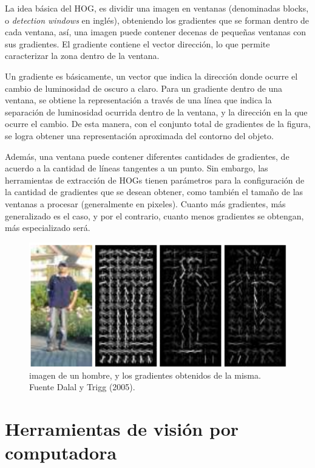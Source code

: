 \documentclass[a4paper,12pt,oneside,spanish]{book}
\begin{document}
La idea básica del HOG, es dividir una imagen en ventanas (denominadas blocks, o \textit{detection windows} en inglés), obteniendo los gradientes que se forman dentro de cada ventana, así, una imagen puede contener decenas de pequeñas ventanas con sus gradientes. El gradiente contiene el vector dirección, lo que permite caracterizar la zona dentro de la ventana.\par

Un gradiente es básicamente, un vector que indica la dirección donde ocurre el cambio de luminosidad de oscuro a claro. Para un gradiente dentro de una ventana, se obtiene la representación a través de una línea que indica la separación de luminosidad ocurrida dentro de la ventana, y la dirección en la que ocurre el cambio. De esta manera, con el conjunto total de gradientes de la figura, se logra obtener una representación aproximada del contorno del objeto.\par

Además, una ventana puede contener diferentes cantidades de gradientes, de acuerdo a la cantidad de líneas tangentes a un punto. Sin embargo, las herramientas de extracción de HOGs tienen parámetros para la configuración de la cantidad de gradientes que se desean obtener, como también el tamaño de las ventanas a procesar (generalmente en pixeles). Cuanto más gradientes, más generalizado es el caso, y por el contrario, cuanto menos gradientes se obtengan, más especializado será.\par

\begin{figure}[h!]
	\includegraphics[width=340pt]{Imagenes/hog1.jpg}
	\centering
	\caption{imagen de un hombre, y los gradientes obtenidos de la misma. Fuente Dalal y Trigg (2005).}
	\label{fig:hog1}
\end{figure}
 

\section{Herramientas de visión por computadora}\label{herramientasdevisionporcomputadora}
\end{document}
